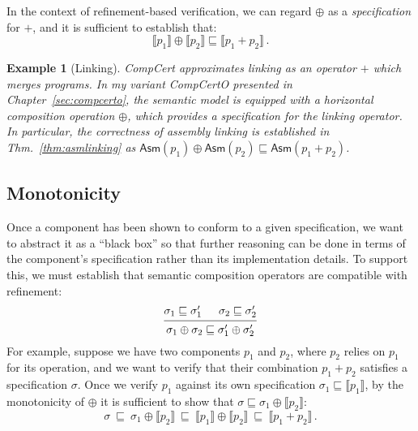 \documentclass[11pt,oneside]{book}
\newtheorem{example}[theorem]{Example}
\theoremstyle{definition}
\newcommand{\kw}[1]{\ensuremath{ \mathsf{#1} }}
\newcommand{\refby}{\sqsubseteq} %
\begin{document}
In the context of refinement-based verification,
we can regard $\oplus$ as a \emph{specification} for $+$,
and it is sufficient to establish that:
\begin{equation}
  \llbracket p_1 \rrbracket \oplus \llbracket p_2 \rrbracket
  \refby
  \llbracket p_1 + p_2 \rrbracket \,.
  \label{eqn:compositional-correctness}
\end{equation}

\begin{example}[Linking]
CompCert approximates \emph{linking}
as an operator $+$ which merges programs.
In my variant CompCertO presented in Chapter~\ref{sec:compcerto},
the semantic model is equipped with a
\emph{horizontal composition} operation $\oplus$,
which provides a specification for the linking operator.
In particular, the correctness of assembly linking
is established in Thm.~\ref{thm:asmlinking} as
$
  \kw{Asm}(p_1) \oplus \kw{Asm}(p_2) \refby
  \kw{Asm}(p_1 + p_2)
$.
\end{example}


\subsection{Monotonicity} %

Once a component has been shown to conform to a given specification,
we want to abstract it as a ``black box''
so that further reasoning can be done in terms of
the component's specification rather than its implementation details.
To support this,
we must establish that semantic composition operators
are compatible with refinement:
\[
  \begin{prooftree}
    \hypo{\sigma_1 \refby \sigma_1'}
    \hypo{\sigma_2 \refby \sigma_2'}
    \infer2{\sigma_1 \oplus \sigma_2 \refby \sigma_1' \oplus \sigma_2'}
  \end{prooftree}
\]
For example,
suppose we have two components $p_1$ and $p_2$,
where $p_2$ relies on $p_1$ for its operation,
and we want to verify that their combination $p_1 + p_2$
satisfies a specification $\sigma$.
Once we verify $p_1$ against its own specification
$\sigma_1 \refby \llbracket p_1 \rrbracket$,
by the monotonicity of ${\oplus}$ it is sufficient to show that
$\sigma \refby \sigma_1 \oplus \llbracket p_2 \rrbracket$:
\[
   \sigma \:\refby\:
   \sigma_1 \oplus \llbracket p_2 \rrbracket \:\refby\:
   \llbracket p_1 \rrbracket \oplus \llbracket p_2 \rrbracket \:\refby\:
   \llbracket p_1 + p_2 \rrbracket \,.
\]
\end{document}
